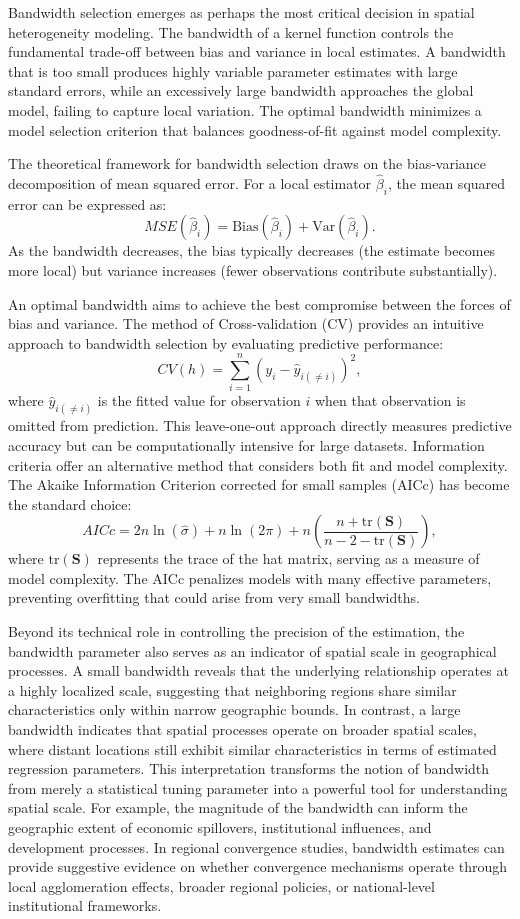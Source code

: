 \documentclass[smallextended, natbib]{svjour3}       %
\begin{document}
Bandwidth selection emerges as perhaps the most critical decision in spatial heterogeneity modeling.
The bandwidth of a kernel function controls the fundamental trade-off between bias and variance in local estimates. 
A bandwidth that is too small produces highly variable parameter estimates with large standard errors, while an excessively large bandwidth approaches the global model, failing to capture local variation.
The optimal bandwidth minimizes a model selection criterion that balances goodness-of-fit against model complexity.

The theoretical framework for bandwidth selection draws on the bias-variance decomposition of mean squared error. 
For a local estimator $\hat{\beta}_i$, the mean squared error can be expressed as:
$$MSE(\hat{\beta}_i) = \text{Bias}(\hat{\beta}_i) + \text{Var}(\hat{\beta}_i).$$
As the bandwidth decreases, the bias typically decreases (the estimate becomes more local) but variance increases (fewer observations contribute substantially). 

An optimal bandwidth aims to achieve the best compromise between the forces of bias and variance.
The method of Cross-validation (CV) provides an intuitive approach to bandwidth selection by evaluating predictive performance:
$$CV(h) = \sum_{i=1}^{n}(y_i - \hat{y}_{i(\neq i)})^2,$$
where $\hat{y}_{i(\neq i)}$ is the fitted value for observation $i$ when that observation is omitted from prediction.
This leave-one-out approach directly measures predictive accuracy but can be computationally intensive for large datasets.
Information criteria offer an alternative method that considers both fit and model complexity. 
The Akaike Information Criterion corrected for small samples (AICc) has become the standard choice:
$$AICc = 2n\ln(\hat{\sigma}) + n\ln(2\pi) + n\left(\frac{n + \text{tr}(\mathbf{S})}{n - 2 - \text{tr}(\mathbf{S})}\right),$$
where $\text{tr}(\mathbf{S})$ represents the trace of the hat matrix, serving as a measure of model complexity. 
The AICc penalizes models with many effective parameters, preventing overfitting that could arise from very small bandwidths.

Beyond its technical role in controlling the precision of the estimation, the bandwidth parameter also serves as an indicator of spatial scale in geographical processes. 
A small bandwidth reveals that the underlying relationship operates at a highly localized scale, suggesting that neighboring regions share similar characteristics only within narrow geographic bounds. 
In contrast, a large bandwidth indicates that spatial processes operate on broader spatial scales, where distant locations still exhibit similar characteristics in terms of estimated regression parameters. 
This interpretation transforms the notion of bandwidth from merely a statistical tuning parameter into a powerful tool for understanding spatial scale.
For example, the magnitude of the bandwidth can inform the geographic extent of economic spillovers, institutional influences, and development processes. 
In regional convergence studies, bandwidth estimates can provide suggestive evidence on whether convergence mechanisms operate through local agglomeration effects, broader regional policies, or national-level institutional frameworks.
\end{document}
